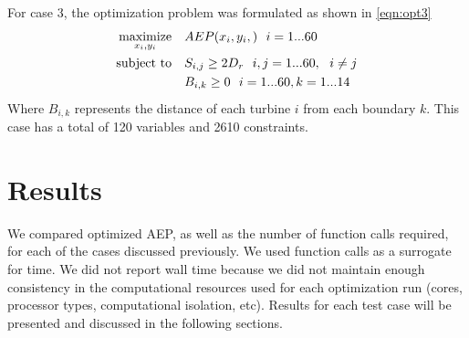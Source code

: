 \documentclass[a4paper]{jpconf}
\begin{document}
%
For case 3, the optimization problem was formulated as shown in \cref{eqn:opt3}
%
\begin{equation}
\label{eqn:opt3}
\begin{aligned} [b]
\underset{x_i,y_i}{\textrm{maximize}} \quad & AEP(x_i,y_i,)~~i=1...60\\
\textrm{subject to} \quad & S_{i,j} \geq 2\*D_{r}~~i,j=1...60,~~i \neq j\\
& B_{i,k} \geq 0 ~~ i=1...60, k=1...14
\end{aligned}
\end{equation}
%
Where $B_{i,k}$ represents the distance of each turbine $i$ from each boundary $k$. This case has a total of 120 variables and 2610 constraints.

\section{Results}\label{sec:results}
We compared optimized AEP, as well as the number of function calls required, for each of the cases discussed previously. We used function calls as a surrogate for time. We did not report wall time because we did not maintain enough consistency in the computational resources used for each optimization run (cores, processor types, computational isolation, etc). Results for each test case will be presented and discussed in the following sections.


\end{document}
